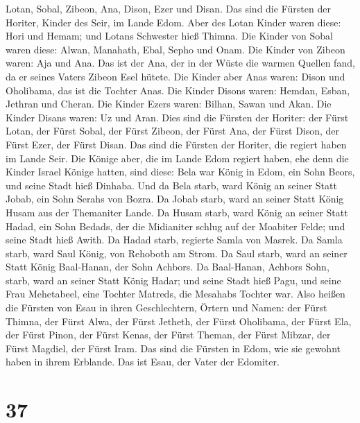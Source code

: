 Lotan, Sobal, Zibeon, Ana, Dison, Ezer und Disan.  Das
sind die Fürsten der Horiter, Kinder des Seir, im Lande Edom.
 Aber des Lotan Kinder waren diese: Hori und Hemam; und
Lotans Schwester hieß Thimna.  Die Kinder von Sobal waren
diese: Alwan, Manahath, Ebal, Sepho und Onam.  Die Kinder
von Zibeon waren: Aja und Ana. Das ist der Ana, der in der Wüste die
warmen Quellen fand, da er seines Vaters Zibeon Esel hütete.
 Die Kinder aber Anas waren: Dison und Oholibama, das ist
die Tochter Anas.  Die Kinder Disons waren: Hemdan,
Esban, Jethran und Cheran.  Die Kinder Ezers waren:
Bilhan, Sawan und Akan.  Die Kinder Disans waren: Uz und
Aran.  Dies sind die Fürsten der Horiter: der Fürst
Lotan, der Fürst Sobal, der Fürst Zibeon, der Fürst Ana, 
der Fürst Dison, der Fürst Ezer, der Fürst Disan. Das sind die Fürsten
der Horiter, die regiert haben im Lande Seir.  Die Könige
aber, die im Lande Edom regiert haben, ehe denn die Kinder Israel Könige
hatten, sind diese:  Bela war König in Edom, ein Sohn
Beors, und seine Stadt hieß Dinhaba.  Und da Bela starb,
ward König an seiner Statt Jobab, ein Sohn Serahs von Bozra.
 Da Jobab starb, ward an seiner Statt König Husam aus der
Themaniter Lande.  Da Husam starb, ward König an seiner
Statt Hadad, ein Sohn Bedads, der die Midianiter schlug auf der Moabiter
Felde; und seine Stadt hieß Awith.  Da Hadad starb,
regierte Samla von Masrek.  Da Samla starb, ward Saul
König, von Rehoboth am Strom.  Da Saul starb, ward an
seiner Statt König Baal-Hanan, der Sohn Achbors.  Da
Baal-Hanan, Achbors Sohn, starb, ward an seiner Statt König Hadar; und
seine Stadt hieß Pagu, und seine Frau Mehetabeel, eine Tochter Matreds,
die Mesahabs Tochter war.  Also heißen die Fürsten von
Esau in ihren Geschlechtern, Örtern und Namen: der Fürst Thimna, der
Fürst Alwa, der Fürst Jetheth,  der Fürst Oholibama, der
Fürst Ela, der Fürst Pinon,  der Fürst Kenas, der Fürst
Theman, der Fürst Mibzar,  der Fürst Magdiel, der Fürst
Iram. Das sind die Fürsten in Edom, wie sie gewohnt haben in ihrem
Erblande. Das ist Esau, der Vater der Edomiter.

\hypertarget{section-36}{%
\section{37}\label{section-36}}

